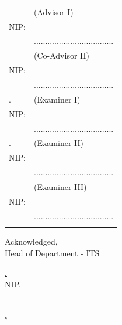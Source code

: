 \noindent
\begin{tabularx}{\textwidth}{X l}
  \advisor{}               & (Advisor I)                         \\
  NIP: \advisornip{}       &                                     \\
                           & ................................... \\
  \coadvisor{}             & (Co-Advisor II)                     \\
  NIP: \coadvisornip{}     &                                     \\
                           & ................................... \\
  \examinerone{}.          & (Examiner I)                        \\
  NIP: \examineronenip{}   &                                     \\
                           & ................................... \\
  \examinertwo{}.          & (Examiner II)                       \\
  NIP: \examinertwonip{}   &                                     \\
                           & ................................... \\
\ifbool{bpenguji3}{
  \examinerthree{}.        & (Examiner III)                      \\
  NIP: \examinerthreenip{} &                                     \\
                           & ................................... \\
}{}
\end{tabularx}
\endgroup

\vspace{-1ex}
\begin{center}
  Acknowledged, \\
  Head of \engdepartment{} Department \engfacultyshort{} - ITS \\

  \vspace{5ex}

  \underline{\headofdepartment{}.} \\
  NIP. \headofdepartmentnip{}
\end{center}

\vspace{-1ex}
\begin{center}
  \textbf{\MakeUppercase{\place{}}\\\ENGMONTH{}, \the\year{}}
\end{center}
\endgroup
